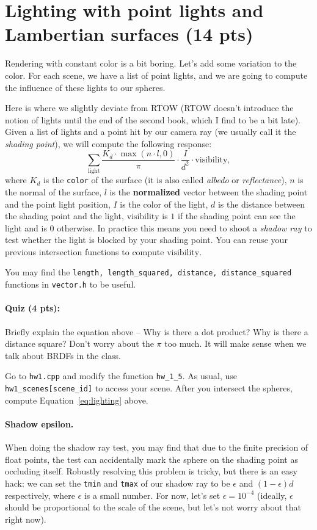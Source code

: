 \section{Lighting with point lights and Lambertian surfaces (14 pts)}
Rendering with constant color is a bit boring. Let's add some variation to the color. For each scene, we have a list of point lights, and we are going to compute the influence of these lights to our spheres.

Here is where we slightly deviate from RTOW (RTOW doesn't introduce the notion of lights until the end of the second book, which I find to be a bit late). Given a list of lights and a point hit by our camera ray (we usually call it the \emph{shading point}), we will compute the following response:
\begin{equation}
    \sum_{\text{light}} \frac{K_d \cdot \max\left(n \cdot l, 0\right)}{\pi} \cdot \frac{I}{d^2} \cdot \text{visibility},
    \label{eq:lighting}
\end{equation}
where $K_d$ is the \lstinline{color} of the surface (it is also called \emph{albedo} or \emph{reflectance}), $n$ is the normal of the surface, $l$ is the \textbf{normalized} vector between the shading point and the point light position, $I$ is the color of the light, $d$ is the distance between the shading point and the light, $\text{visibility}$ is $1$ if the shading point can see the light and is $0$ otherwise. In practice this means you need to shoot a \emph{shadow ray} to test whether the light is blocked by your shading point. You can reuse your previous intersection functions to compute $\text{visibility}$. 

You may find the \lstinline{length, length_squared, distance, distance_squared} functions in \lstinline{vector.h} to be useful.

\paragraph{Quiz (4 pts):} Briefly explain the equation above -- Why is there a dot product? Why is there a distance square? Don't worry about the $\pi$ too much. It will make sense when we talk about BRDFs in the class.

Go to \lstinline{hw1.cpp} and modify the function \lstinline{hw_1_5}. As usual, use \lstinline{hw1_scenes[scene_id]} to access your scene. After you intersect the spheres, compute Equation~\eqref{eq:lighting} above.

\paragraph{Shadow epsilon.} When doing the shadow ray test, you may find that due to the finite precision of float points, the test can accidentally mark the sphere on the shading point as occluding itself. Robustly resolving this problem is tricky, but there is an easy hack: we can set the \lstinline{tmin} and \lstinline{tmax} of our shadow ray to be $\epsilon$ and $\left(1 - \epsilon\right) d$ respectively, where $\epsilon$ is a small number. For now, let's set $\epsilon = 10^{-4}$ (ideally, $\epsilon$ should be proportional to the scale of the scene, but let's not worry about that right now).

